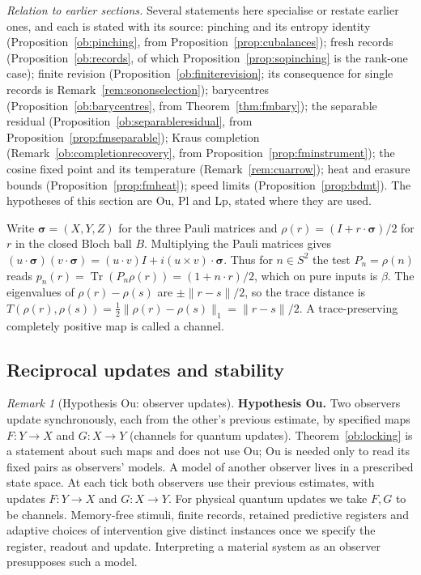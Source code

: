 \documentclass[aps,pra,onecolumn,superscriptaddress,nofootinbib,10pt]{revtex4-2}
\theoremstyle{definition}
\theoremstyle{remark}
\newtheorem{remark}[theorem]{Remark}
\newcommand{\tr}{\operatorname{Tr}}
\begin{document}
\smallskip\noindent\emph{Relation to earlier sections.}  Several statements here specialise or restate earlier ones,
and each is stated with its source: pinching and its entropy identity (Proposition~\ref{ob:pinching}, from
Proposition~\ref{prop:cubalances}); fresh records (Proposition~\ref{ob:records}, of which Proposition~\ref{prop:sopinching} is the
rank-one case); finite revision (Proposition~\ref{ob:finiterevision}; its consequence for single records is
Remark~\ref{rem:sononselection}); barycentres (Proposition~\ref{ob:barycentres}, from Theorem~\ref{thm:fmbary}); the separable
residual (Proposition~\ref{ob:separableresidual}, from Proposition~\ref{prop:fmseparable}); Kraus completion
(Remark~\ref{ob:completionrecovery}, from Proposition~\ref{prop:fminstrument}); the cosine fixed point and its temperature
(Remark~\ref{rem:cuarrow}); heat and erasure bounds (Proposition~\ref{prop:fmheat}); speed limits
(Proposition~\ref{prop:bdmt}).  The hypotheses of this section are Ou, Pl and Lp, stated where they are used.

Write $\boldsymbol{\sigma}=(X,Y,Z)$ for the three Pauli matrices and
$\rho(r)=(I+r\cdot\boldsymbol{\sigma})/2$ for $r$ in the closed Bloch
ball $B$. Multiplying the Pauli matrices gives
$(u\cdot\boldsymbol{\sigma})(v\cdot\boldsymbol{\sigma})
=(u\cdot v)I+i(u\times v)\cdot\boldsymbol{\sigma}$.
Thus for $n\in S^2$ the test $P_n=\rho(n)$ reads
$p_n(r)=\tr(P_n\rho(r))=(1+n\cdot r)/2$, which on pure inputs is $\beta$.
The eigenvalues of $\rho(r)-\rho(s)$ are $\pm\|r-s\|/2$, so the trace
distance is $T(\rho(r),\rho(s))=\tfrac12\|\rho(r)-\rho(s)\|_1=\|r-s\|/2$.
A trace-preserving completely positive map is called a channel.

\subsection{Reciprocal updates and stability}\label{ob:dynamics}

\begin{remark}[Hypothesis Ou: observer updates]\label{ob:observermodel}
\textbf{Hypothesis Ou.}\label{hyp:Ou}  Two observers update synchronously, each from the other's previous estimate, by specified
maps $F\colon Y\to X$ and $G\colon X\to Y$ (channels for quantum updates).  Theorem~\ref{ob:locking} is a statement about such
maps and does not use Ou; Ou is needed only to read its fixed pairs as observers' models.
A model of another observer lives in a prescribed state space.
At each tick both observers use their previous estimates, with updates
$F\colon Y\to X$ and $G\colon X\to Y$. For physical quantum updates
we take $F,G$ to be channels. Memory-free stimuli, finite records,
retained predictive registers and adaptive choices of intervention
give distinct instances once we specify the register, readout and update.
Interpreting a material system as an observer presupposes such a model.
\end{remark}
\end{document}
